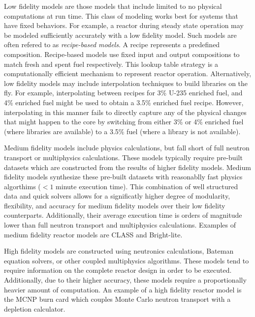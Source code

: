\documentclass{article}
\begin{document}
Low fidelity models are those models that include limited to no physical computations at run time.
This class of modeling works best for systems that have fixed behaviors. For example, a reactor
during steady state operation may be modeled sufficiently accurately with a low fidelity model.
Such models are often refered to as \emph{recipe-based models}. A recipe represents a predefined
composition. Recipe-based models use fixed input and output compositions to
match fresh and spent
fuel respectively. This lookup table strategy is a computationally efficient mechanism to
represent reactor operation. Alternatively, low fidelity models may include interpolation
techniques to build libraries on the fly. For example, interpolating between recipes for
3\% U-235 enriched fuel, and 4\% enriched fuel might be used to obtain a 3.5\% enriched
fuel recipe.
However, interpolating in this manner fails to directly capture any of the physical changes
that might happen to the core by switching from either 3\% or 4\% enriched fuel (where libraries 
are available) to a 3.5\% fuel (where a library is not available).

Medium fidelity models include physics calculations, but fall short of
full neutron transport or multiphysics calculations. These models typically require
pre-built datasets which are constructed from the results of higher fidelity models.
Medium fidelity models synthesize these pre-built datasets with reasonablly fast physics
algorthims ($<1$ minute execution time). This combination of well structured data and
quick solvers allows for a significatly higher degree of modularity, flexibility, and accuracy
for medium fidelity models over their low fidelity counterparts. Additionally, their average
execution time is orders of magnitude lower than full neutron transport and multiphysics
calculations. Examples of medium fidelity reactor models are CLASS\cite{class}
and Bright-lite\cite{brightlite}.

High fidelity models are constructed using neutronics calculations, Bateman
equation solvers\cite{bateman1910, bateman}, or other coupled multiphysics algorithms. These models tend
to require information on the complete reactor design in order to be executed.
Additionally, due to their higher accuracy, these models require a proportionally heavier amount
of computation. An example of a high fidelity reactor model is the
MCNP\cite{mcnp5monte} burn card which couples Monte Carlo neutron transport with a depletion
calculator.
\end{document}
